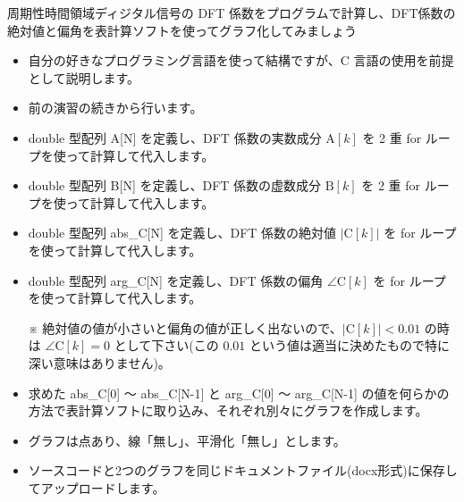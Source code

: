 \documentclass[a4paper]{jarticle}
\begin{document}
 周期性時間領域ディジタル信号の DFT 係数をプログラムで計算し、DFT係数の絶対値と偏角を表計算ソフトを使ってグラフ化してみましょう  \par
\par\vspace{1zh}
\begin{itemize}
\item 自分の好きなプログラミング言語を使って結構ですが、C 言語の使用を前提として説明します。
\item 前の演習の続きから行います。
\item double 型配列 A[N] を定義し、DFT 係数の実数成分 $\textrm{A}[k]$ を 2 重 for ループを使って計算して代入します。
\item double 型配列 B[N] を定義し、DFT 係数の虚数成分 $\textrm{B}[k]$ を 2 重 for ループを使って計算して代入します。
\item double 型配列 abs\_C[N] を定義し、DFT 係数の絶対値 $|\textrm{C}[k]|$ を for ループを使って計算して代入します。
\item double 型配列 arg\_C[N] を定義し、DFT 係数の偏角 $\angle\textrm{C}[k]$ を for ループを使って計算して代入します。\par
 ※  絶対値の値が小さいと偏角の値が正しく出ないので、$|\textrm{C}[k]| < 0.01$ の時は $\angle\textrm{C}[k] = 0$ として下さい(この $0.01$ という値は適当に決めたもので特に深い意味はありません)。\par
\item 求めた abs\_C[0] 〜  abs\_C[N-1] と arg\_C[0] 〜 arg\_C[N-1] の値を何らかの方法で表計算ソフトに取り込み、それぞれ別々にグラフを作成します。
\item グラフは点あり、線「無し」、平滑化「無し」とします。
\item ソースコードと2つのグラフを同じドキュメントファイル(docx形式)に保存してアップロードします。
\end{itemize}

\savepractime
\end{document}

